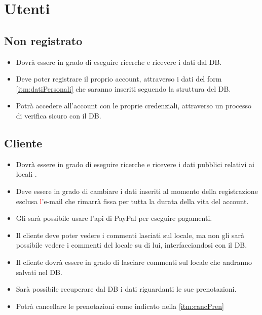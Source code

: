 \section{Utenti}

\subsection{Non registrato}
\begin{itemize}
    \item Dovrà essere in grado di eseguire ricerche e ricevere i dati dal DB.
    \item Deve poter registrare il proprio account, attraverso i dati del form 
    \ref{itm:datiPersonali} che saranno inseriti seguendo la struttura del DB.
    \item Potrà accedere all'account con le proprie credenziali, attraverso un processo di 
    verifica sicuro con il DB.
\end{itemize}

\subsection{Cliente}
\begin{itemize}
    \item Dovrà essere in grado di eseguire ricerche e ricevere i dati pubblici relativi ai 
    locali .
    \item Deve essere in grado di cambiare i dati inseriti al momento della registrazione 
    esclusa \textcolor{red}{l}'e-mail che rimarrà fissa per tutta la durata della vita del account.
    \item Gli sarà possibile usare l’api di PayPal per eseguire pagamenti.
    \item Il cliente deve poter vedere i commenti lasciati sul locale, ma non gli sarà possibile 
    vedere i commenti del locale su di lui, interfacciandosi con il DB.
    \item Il cliente dovrà essere in grado di lasciare commenti sul locale che andranno salvati 
    nel DB.
    \item Sarà possibile recuperare dal DB i dati riguardanti le sue prenotazioni.
    \item Potrà cancellare le prenotazioni come indicato nella \ref{itm:cancPren}
\end{itemize}

